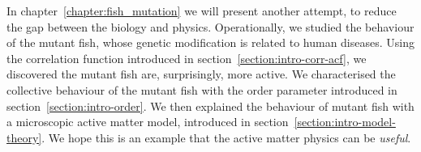 \documentclass[11pt,twoside]{report}
\begin{document}
In chapter~\ref{chapter:fish_mutation} we will present another attempt, to reduce the gap between the biology and physics. 
Operationally, we studied the behaviour of the mutant fish, whose genetic modification is related to human diseases.
Using the correlation function introduced in section~\ref{section:intro-corr-acf}, we discovered the mutant fish are, surprisingly, more active.
We characterised the collective behaviour of the mutant fish with the order parameter introduced in section~\ref{section:intro-order}.
We then explained the behaviour of mutant fish with a microscopic active matter model, introduced in section~\ref{section:intro-model-theory}.
We hope this is an example that the active matter physics can be \emph{useful}.


\begin{adjustwidth}{0cm}{-5cm}

\begin{tcolorbox}[
fonttitle=\sffamily\Large,
right=0.1\linewidth,
top=5mm,
bottom=5mm,
title=Summary of Chapter 2,
]


\end{tcolorbox}
\end{adjustwidth}
\end{document}
